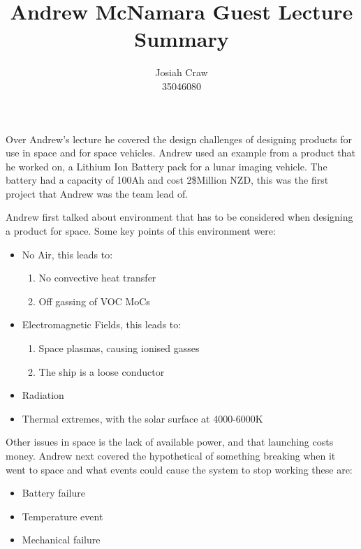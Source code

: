\documentclass{article}
\title{Andrew McNamara Guest Lecture Summary}
\author{Josiah Craw\\35046080}
\begin{document}
\maketitle

Over Andrew's lecture he covered the design challenges of designing products for use in space and
for space vehicles. Andrew used an example from a product that he worked on, a Lithium Ion Battery
pack for a lunar imaging vehicle. The battery had a capacity of 100Ah and cost 2\$Million NZD, this
was the first project that Andrew was the team lead of.

Andrew first talked about environment that has to be considered when designing a product for space.
Some key points of this environment were: 

\begin{itemize}

    \item{No Air, this leads to:}
        \begin{enumerate}
            \item{No convective heat transfer}
            \item{Off gassing of VOC MoCs}
        \end{enumerate}
    \item{Electromagnetic Fields, this leads to:}
        \begin{enumerate}
            \item{Space plasmas, causing ionised gasses}
            \item{The ship is a loose conductor}
        \end{enumerate}
    \item{Radiation}
    \item{Thermal extremes, with the solar surface at 4000-6000\textdegree K}

\end{itemize}

Other issues in space is the lack of available power, and that launching costs money. Andrew next
covered the hypothetical of something breaking when it went to space and what events could cause the
system to stop working these are:

\begin{itemize}

    \item{Battery failure}

    \item{Temperature event}

    \item{Mechanical failure}

\end{itemize}
\end{document}
